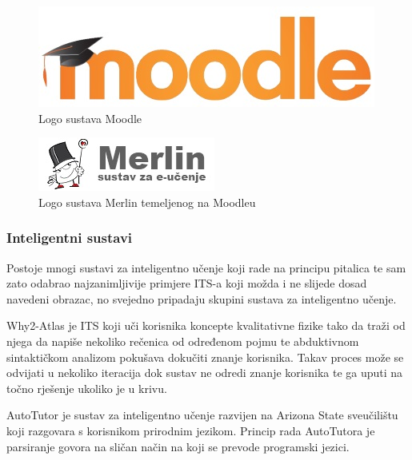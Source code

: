 \documentclass[times, utf8, zavrsni, numeric]{fer}
\begin{document}
\begin{figure}[htb]
	\centering
	\includegraphics[]{img/moodle.jpg}
	\caption{Logo sustava Moodle\cite{moodlelogopic}}
	\label{fig:moodle}
\end{figure}

\begin{figure}[htb]
	\centering
	\includegraphics[]{img/merlin.jpg}
	\caption{Logo sustava Merlin temeljenog na Moodleu\cite{merlinpic}}
	\label{fig:merlin}
\end{figure}

\subsubsection{Inteligentni sustavi}
Postoje mnogi sustavi za inteligentno učenje koji rade na principu pitalica te sam zato odabrao najzanimljivije primjere ITS-a koji možda i ne slijede dosad navedeni obrazac, no svejedno pripadaju skupini sustava za inteligentno učenje.
\par
Why2-Atlas je ITS koji uči korisnika koncepte kvalitativne fizike tako da traži od njega da napiše nekoliko rečenica od određenom pojmu te abduktivnom sintaktičkom analizom pokušava dokučiti znanje korisnika. Takav proces može se odvijati u nekoliko iteracija dok sustav ne odredi znanje korisnika te ga uputi na točno rješenje ukoliko je u krivu.\cite{why2atlas}
\par
AutoTutor je sustav za inteligentno učenje razvijen na Arizona State sveučilištu koji razgovara s korisnikom prirodnim jezikom. Princip rada AutoTutora je parsiranje govora na sličan način na koji se prevode programski jezici.\cite{autotutor}
\end{document}
